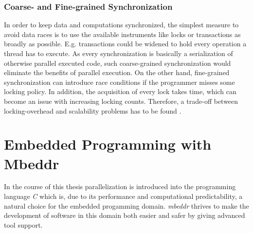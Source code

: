 \subsubsection{Coarse- and Fine-grained Synchronization}
In order to keep data and computations synchronized, the simplest measure to avoid data races is to use the available instruments like locks or transactions as broadly as possible. E.g. transactions could be widened to hold every operation a thread has to execute. As every synchronization is basically a serialization of otherwise parallel executed code, such coarse-grained synchronization would eliminate the benefits of parallel execution. On the other hand, fine-grained synchronization can introduce race conditions if the programmer misses some locking policy. In addition, the acquisition of every lock takes time, which can become an issue with increasing locking counts. Therefore, a trade-off between locking-overhead and scalability problems has to be found \cite[pp.~1-2]{PrinciplesOfTransactionalMemory}.



\section{Embedded Programming with Mbeddr}
In the course of this thesis parallelization is introduced into the programming language \textit{C} which is, due to its performance and computational predictability, a natural choice for the embedded progamming domain. \textit{mbeddr} thrives to make the development of software in this domain both easier and safer by giving advanced tool support. 

